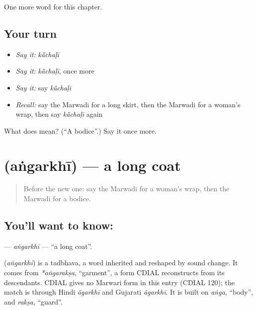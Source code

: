 \begin{grammarlens}[title={What you've built}]
One more word for this chapter.
\end{grammarlens}

\subsection*{Your turn}
\begin{itemize}
\raggedright
  \item \emph{Say it:} \emph{kā̃chaḷī}
  \item \emph{Say it:} \emph{kā̃chaḷī}, once more
  \item \emph{Say it:} say \emph{kā̃chaḷī}
  \item \emph{Recall:} say the Marwadi for a long skirt, then the Marwadi for a woman's wrap, then say \emph{kā̃chaḷī} again
\end{itemize}

\begin{tcolorbox}[breakable,colback=teal!4,colframe=teal!35!black,title={Before you move on}]
What does  mean? (\textquotedblleft{}A bodice\textquotedblright{}.) Say it once more.
\end{tcolorbox}
\section[\texorpdfstring{\mw{अंगरखी} (aṅgarkhī)}{अंगरखी (aṅgarkhī)}]{ (aṅgarkhī) — a long coat}

\label{lesson:MW-C128-angarkhi}



\begin{quote}
Before the new one: say the Marwadi for a woman's wrap, then the Marwadi for a bodice.
\end{quote}

\subsection*{You'll want to know: }
\textbf{} — \emph{aṅgarkhī} — \textquotedblleft{}a long coat\textquotedblright{}.

\begin{cousinweb}
\textbf{} (\emph{aṅgarkhī}) is a tadbhava, a word inherited and reshaped by sound change. It comes from \emph{*aṅgarakṣa}, \textquotedblleft{}garment\textquotedblright{}, a form CDIAL reconstructs from its descendants. CDIAL gives no Marwari form in this entry (CDIAL 120); the match is through Hindi \emph{ãgarkhī} and Gujarati \emph{ãgarkhī}. It is built on \emph{aṅga}, \textquotedblleft{}body\textquotedblright{}, and \emph{rakṣa}, \textquotedblleft{}guard\textquotedblright{}.
\end{cousinweb}

